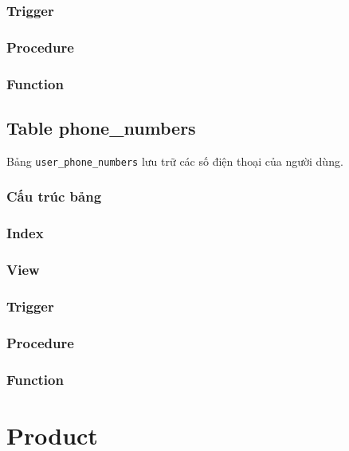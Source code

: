 \subsubsection{Trigger}

\subsubsection{Procedure}

\subsubsection{Function}

\subsection{Table phone\_numbers}

Bảng \texttt{user\_phone\_numbers} lưu trữ các số điện thoại của người dùng.

\subsubsection{Cấu trúc bảng}

\subsubsection{Index}

\subsubsection{View}

\subsubsection{Trigger}

\subsubsection{Procedure}

\subsubsection{Function}

\section{Product}


